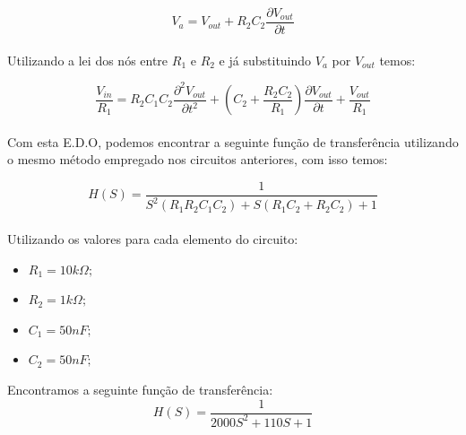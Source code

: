 \documentclass[a4paper, 12pt]{article}
\begin{document}
			\[
			V_{a} = V_{out} + R_{2}C_{2}\frac{\partial V_{out}}{\partial t}
			\] 	\\

			Utilizando a lei dos nós entre $R_{1}$ e $R_{2}$ e já substituindo $V_{a}$ por $V_{out}$ temos:

			\[
			\frac{V_{in}}{R_{1}} = R_{2}C_{1}C_{2}\frac{\partial^{2} V_{out}}{\partial t^{2}} + \left(C_{2} + \frac{R_{2}C_{2}}{R_{1}}\right)\frac{\partial V_{out}}{\partial t} +  \frac{V_{out}}{R_{1}}
			\] 	\\

			Com esta E.D.O, podemos encontrar a seguinte função de transferência utilizando o mesmo método empregado nos circuitos anteriores, com isso temos:

			\[
			H(S) = \frac{1}{S^{2}\left(R_{1}R_{2}C_{1}C_{2}\right) + S\left(R_{1}C_{2} + R_{2}C_{2}\right) + 1}
			\] 	\\

			Utilizando os valores para cada elemento do circuito:
			\begin{itemize}
				\item $R_{1} = 10k\Omega;$
				\item $R_{2} = 1k\Omega;$
				\item $C_{1} = 50nF;$
				\item $C_{2} = 50nF;$
			\end{itemize}

			Encontramos a seguinte função de transferência:
			\[
			H(S) = \frac{1}{2000S^{2} + 110S + 1}
			\] 	\\
\end{document}
